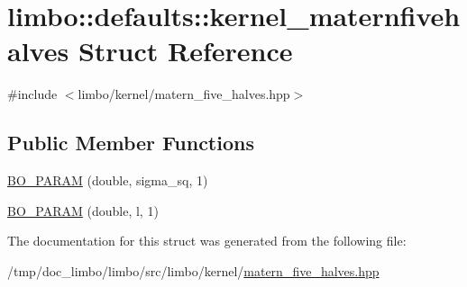 \hypertarget{structlimbo_1_1defaults_1_1kernel__maternfivehalves}{}\section{limbo\+:\+:defaults\+:\+:kernel\+\_\+maternfivehalves Struct Reference}
\label{structlimbo_1_1defaults_1_1kernel__maternfivehalves}


{\ttfamily \#include $<$limbo/kernel/matern\+\_\+five\+\_\+halves.\+hpp$>$}

\subsection*{Public Member Functions}
\begin{DoxyCompactItemize}
\item 
\hyperlink{group__kernel__defaults_ga001b0195485017f316c32002aba15139}{B\+O\+\_\+\+P\+A\+R\+AM} (double, sigma\+\_\+sq, 1)
\item 
\hyperlink{group__kernel__defaults_gabc34e7cdebd3b2db4ffa355ac8eb51e9}{B\+O\+\_\+\+P\+A\+R\+AM} (double, l, 1)
\end{DoxyCompactItemize}


The documentation for this struct was generated from the following file\+:\begin{DoxyCompactItemize}
\item 
/tmp/doc\+\_\+limbo/limbo/src/limbo/kernel/\hyperlink{matern__five__halves_8hpp}{matern\+\_\+five\+\_\+halves.\+hpp}\end{DoxyCompactItemize}
